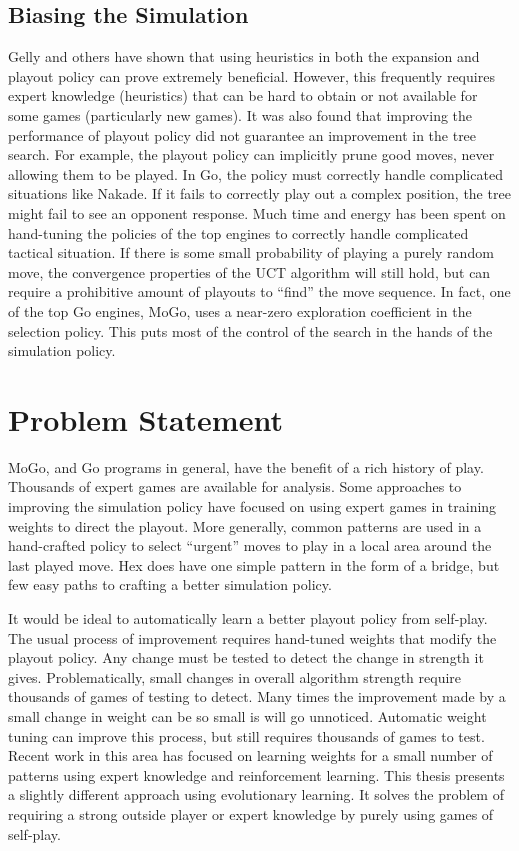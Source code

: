 \documentclass[10pt,a4paper]{report}
\begin{document}
\subsection{Biasing the Simulation}\label{bias}
Gelly and others have shown that using heuristics in both the expansion and playout policy can prove extremely beneficial\cite{gelly2006modification}\cite{gelly2008achieving}. However, this frequently requires expert knowledge (heuristics) that can be hard to obtain or not available for some games (particularly new games). It was also found that improving the performance of playout policy did not guarantee an improvement in the tree search. For example, the playout policy can implicitly prune good moves, never allowing them to be played. In Go, the policy must correctly handle complicated situations like Nakade. If it fails to correctly play out a complex position, the tree might fail to see an opponent response. Much time and energy has been spent on hand-tuning the policies of the top engines to correctly handle complicated tactical situation. If there is some small probability of playing a purely random move, the convergence properties of the UCT algorithm will still hold, but can require a prohibitive amount of playouts to ``find'' the move sequence. In fact, one of the top Go engines, MoGo, uses a near-zero exploration coefficient in the selection policy\cite{gelly2007combining}. This puts most of the control of the search in the hands of the simulation policy.

\section{Problem Statement}\label{problem}
MoGo, and Go programs in general, have the benefit of a rich history of play. Thousands of expert games are available for analysis. Some approaches to improving the simulation policy have focused on using expert games in training weights to direct the playout\cite{chaslot2010adding}. More generally, common patterns are used in a hand-crafted policy to select ``urgent'' moves to play in a local area around the last played move. Hex does have one simple pattern in the form of a bridge\cite{anshelevich2002hierarchical}, but few easy paths to crafting a better simulation policy.

It would be ideal to automatically learn a better playout policy from self-play. The usual process of improvement requires hand-tuned weights that modify the playout policy. Any change must be tested to detect the change in strength it gives. Problematically, small changes in overall algorithm strength require thousands of games of testing to detect. Many times the improvement made by a small change in weight can be so small is will go unnoticed. Automatic weight tuning can improve this process, but still requires thousands of games to test. Recent work in this area has focused on learning weights for a small number of patterns using expert knowledge and reinforcement learning\cite{silver2009monte}. This thesis presents a slightly different approach using evolutionary learning. It solves the problem of requiring a strong outside player or expert knowledge by purely using games of self-play.
\end{document}
